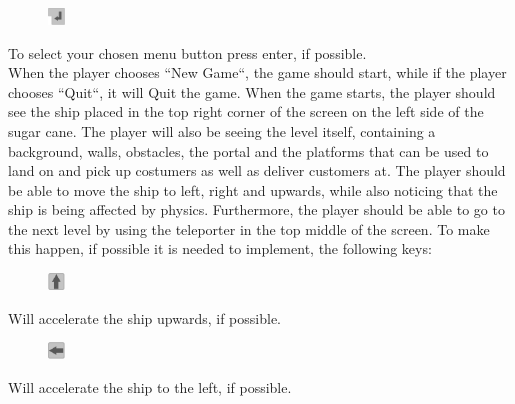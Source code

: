 \documentclass[../master.tex]{subfile}
\begin{document}
\begin{figure}
	\vspace{-5.8mm}
	\begin{centering}
		\includegraphics[width=0.04\textwidth]{./Pictures/Enter.png}
	\end{centering}
	\vspace{-6mm}
\end{figure}
To select your chosen menu button press enter, if possible.\\

When the player chooses ``New Game``, the game should start, while if the player chooses ``Quit``, it will Quit the game. When the game starts, the player should see the ship placed in the top right corner of the screen on the left side of the sugar cane. The player will also be seeing the level itself, containing a background, walls, obstacles, the portal and the platforms that can be used to land on and pick up costumers as well as deliver customers at. The player should be able to move the ship to left, right and upwards, while also noticing that the ship is being affected by physics. Furthermore, the player should be able to go to the next level by using the teleporter in the top middle of the screen. To make this happen, if possible it is needed to implement, the following keys:\\
\begin{figure}
	\vspace{-6mm}
	\begin{centering}
		\includegraphics[width=0.04\textwidth]{./Pictures/Pil_op.png}
	\end{centering}
	\vspace{-6mm}
\end{figure}
Will accelerate the ship upwards, if possible.\\

\begin{figure}
	\vspace{-6mm}
	\begin{centering}
		\includegraphics[width=0.04\textwidth]{./Pictures/Pil_venstre.png}
	\end{centering}
	\vspace{-6mm}
\end{figure}
Will accelerate the ship to the left, if possible.\\
\end{document}
